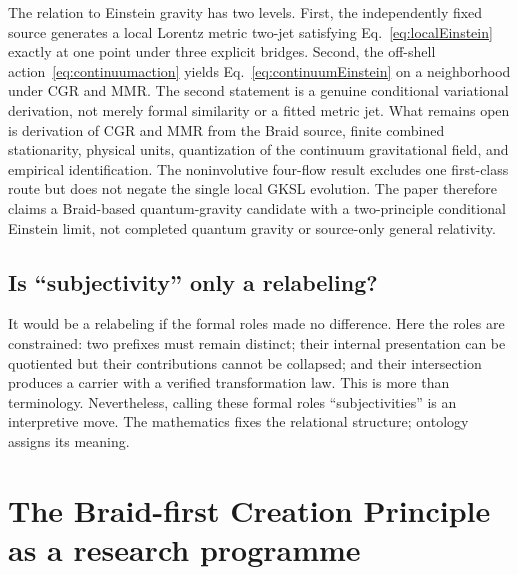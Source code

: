 \documentclass[11pt]{article}
\theoremstyle{definition}
\theoremstyle{remark}
\begin{document}
The relation to Einstein gravity has two levels. First, the independently fixed source generates a local Lorentz metric two-jet satisfying Eq.~\eqref{eq:localEinstein} exactly at one point under three explicit bridges. Second, the off-shell action~\eqref{eq:continuumaction} yields Eq.~\eqref{eq:continuumEinstein} on a neighborhood under CGR and MMR. The second statement is a genuine conditional variational derivation, not merely formal similarity or a fitted metric jet. What remains open is derivation of CGR and MMR from the Braid source, finite combined stationarity, physical units, quantization of the continuum gravitational field, and empirical identification. The noninvolutive four-flow result excludes one first-class route but does not negate the single local GKSL evolution. The paper therefore claims a Braid-based quantum-gravity candidate with a two-principle conditional Einstein limit, not completed quantum gravity or source-only general relativity.

\subsection{Is ``subjectivity'' only a relabeling?}

It would be a relabeling if the formal roles made no difference. Here the roles are constrained: two prefixes must remain distinct; their internal presentation can be quotiented but their contributions cannot be collapsed; and their intersection produces a carrier with a verified transformation law. This is more than terminology. Nevertheless, calling these formal roles ``subjectivities'' is an interpretive move. The mathematics fixes the relational structure; ontology assigns its meaning.

\section{The Braid-first Creation Principle as a research programme}
\end{document}
